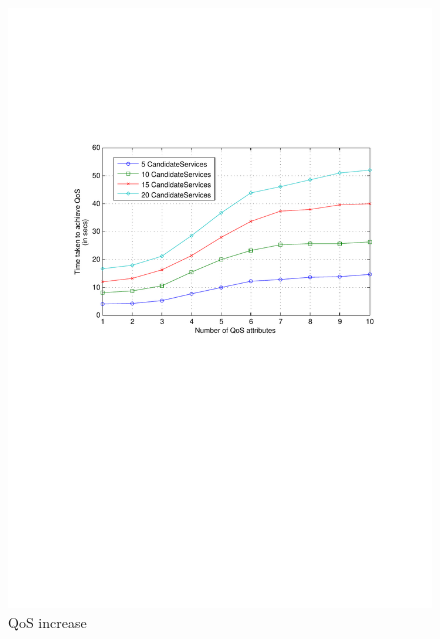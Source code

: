 \documentclass[10pt,journal,compsoc]{IEEEtran}
\begin{document}
\begin{figure}[htbp]
  \centering
  \includegraphics[clip, trim=4cm 14cm 2cm 6cm, scale=0.42]{graphs/5_10_15_20_svc_per_qos_scaling.pdf}
  \caption{QoS increase \label{fig:svc_per_qos}}
\end{figure}
\end{document}
